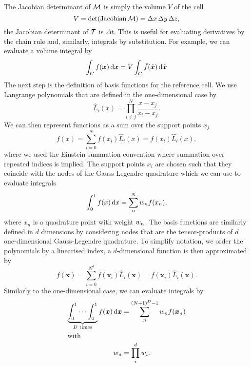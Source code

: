 The Jacobian determinant of $\mapping$ is simply the volume $V$ of the cell
\begin{equation}
  \label{eq:determinant-mapping}
  \volume = \operatorname{det}(\operatorname{Jacobian}\mapping) = \Delta x \, \Delta y \,\Delta z,
\end{equation}
the Jacobian determinant of $\timeMapping$ is $\Delta t$.
This is useful for evaluating derivatives by the chain rule and, similarly, integrals by substitution.
For example, we can evaluate a volume integral by
\begin{equation}
  \label{eq:integration-by-substitution}
  \intdcell{
f(\bm{x})
  }
  =
\volume \intdrefcell{
    \hat{f}(\hat{\bm{x}})
  }
\end{equation}
\newcommand{\lagrangeRef}[1][i]{\hat{L}_{#1}}
\newcommand{\lagrange}[1][i]{L_{#1}}
The next step is the definition of basis functions for the reference cell.
We use Langrange polynomials that are defined in the one-dimensional case by
\begin{equation}
  \label{eq:lagrange-basis}
  \lagrangeRef(x) = \prod_{i \neq j}^N \frac{x - x_j}{x_i - x_j}.
\end{equation}
We can then represent functions as a sum over the support points $x_j$
\begin{equation}
  \label{eq:langrange-expansion-1d}
  f(x) = \sum_{i = 0}^N f(x_i) \lagrangeRef[i](x) = f(x_i) \lagrangeRef[i](x),
\end{equation}
where we used the Einstein summation convention where summation over repeated indices is implied.
The support points $x_i$ are chosen such that they coincide with the nodes of the Gauss-Legendre quadrature which we can use to evaluate integrals
\begin{equation}
  \label{eq:quadrature-1d}
  \int_0^1 f(x) \dd{x} = \sum_n^N \quadWeight[n] f(x_n),
\end{equation}
where $x_n$ is a quadrature point with weight $\quadWeight[n]$.
The basis functions are similarly defined in $d$ dimensions by considering nodes that are the tensor-products of $d$ one-dimensional Gauss-Legendre quadrature.
To simplify notation, we order the polynomials by a linearised index, a $d$-dimensional function is then approximated by
\begin{equation}
  \label{eq:lagrange-expansion}
  f(\bm{x}) = \sum_{i = 0}^{N^d} f(\bm{x}_i) \lagrangeRef[i](\bm{x}) = f(\bm{x}_i) \lagrangeRef[i](\bm{x}).
\end{equation}
Similarly to the one-dimensional case, we can evaluate integrals by
\begin{align}
  \label{eq:quadrature}
  \underbrace{\int_0^1 \cdots \int_0^1}_{D \text{ times}} f(\bm{x}) \dd{\bm{x}} &= \sum_n^{(N+1)^D - 1} \quadWeight[n] f(\bm{x}_n) \\
  \intertext{with}
  \quadWeight[n] &= \prod_{i}^{d} \quadWeight[i].
\end{align}

